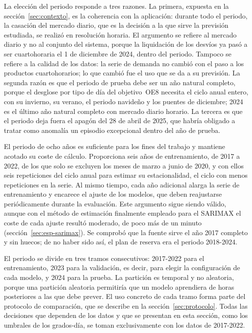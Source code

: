 La elección del periodo responde a tres razones. La primera, expuesta en la
sección~\ref{sec:contexto}, es la coherencia con la aplicación: durante todo
el periodo, la casación del mercado diario, que es la decisión a la que sirve
la previsión estudiada, se realizó en resolución horaria. El argumento se
refiere al mercado diario y no al conjunto del sistema, porque la
liquidación de los desvíos ya pasó a ser cuartohoraria el 1 de diciembre de
2024, dentro del periodo. Tampoco se refiere a la calidad de los datos: la
serie de demanda no cambió con el paso a los productos cuartohorarios; lo
que cambió fue el uso que se da a su previsión. La segunda razón es que el
periodo de prueba debe ser un año natural completo, porque el desglose por
tipo de día del objetivo~OE8 necesita el ciclo anual entero, con su invierno,
su verano, el periodo navideño y los puentes de diciembre; 2024 es el último
año natural completo con mercado diario horario. La tercera es que el
periodo deja fuera el apagón del 28 de abril de 2025, que habría obligado a
tratar como anomalía un episodio excepcional dentro del año de prueba.

El periodo de ocho años es suficiente para los fines del trabajo y mantiene
acotado su coste de cálculo. Proporciona seis años de entrenamiento, de 2017
a 2022, de los que solo se excluyen los meses de marzo a junio de 2020, y
con ellos seis repeticiones del ciclo anual para estimar su estacionalidad,
el ciclo con menos repeticiones en la serie. Al mismo
tiempo, cada año adicional alarga la serie de entrenamiento y encarece el
ajuste de los modelos, que deben reajustarse periódicamente durante la
evaluación. Este argumento sigue siendo válido, aunque con el método de
estimación finalmente empleado para el SARIMAX el coste de cada ajuste
resultó moderado, de poco más de un minuto
(sección~\ref{sec:esp-sarimax}). Se comprobó que la fuente
sirve el año 2017 completo y sin huecos; de no haber sido así, el plan de
reserva era el periodo 2018-2024.

El periodo se divide en tres tramos consecutivos: 2017-2022 para el
entrenamiento, 2023 para la validación, es decir, para elegir la
configuración de cada modelo, y 2024 para la prueba. La partición es
temporal y no aleatoria, porque una partición aleatoria permitiría que un
modelo aprendiera de horas posteriores a las que debe prever. El uso
concreto de cada tramo forma parte del protocolo de comparación, que se
describe en la sección~\ref{sec:protocolo}. Todas las decisiones que dependen de
los datos y que se presentan en esta sección, como los umbrales de los
grados-día, se toman exclusivamente con los datos de 2017-2022.


